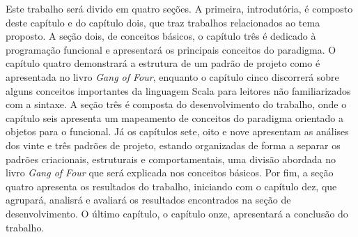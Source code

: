 
Este trabalho será divido em quatro seções. 
A primeira, introdutória, é composto deste capítulo 
e do capítulo dois, que traz trabalhos relacionados 
ao tema proposto. A seção dois, de conceitos 
básicos, o capítulo três é dedicado à programação 
funcional e apresentará os principais conceitos do 
paradigma. O capítulo quatro demonstrará a 
estrutura de um padrão de projeto como é apresentada 
no livro \textit{Gang of Four}, enquanto o capítulo 
cinco discorrerá sobre alguns conceitos importantes 
da linguagem Scala para leitores não familiarizados 
com a sintaxe. A seção três é composta do desenvolvimento 
do trabalho, onde o capítulo seis apresenta um 
mapeamento de conceitos do paradigma orientado a 
objetos para o funcional. Já os capítulos sete, 
oito e nove apresentam as análises dos vinte e 
três padrões de projeto, estando organizadas 
de forma a separar os padrões criacionais, 
estruturais e comportamentais, uma divisão 
abordada no livro \textit{Gang of Four} que será 
explicada nos conceitos básicos. Por fim, 
a seção quatro apresenta os resultados do 
trabalho, iniciando com o capítulo dez, 
que agrupará, analisrá e avaliará os 
resultados encontrados na seção de 
desenvolvimento. O último capítulo, 
o capítulo onze, apresentará a conclusão 
do trabalho.